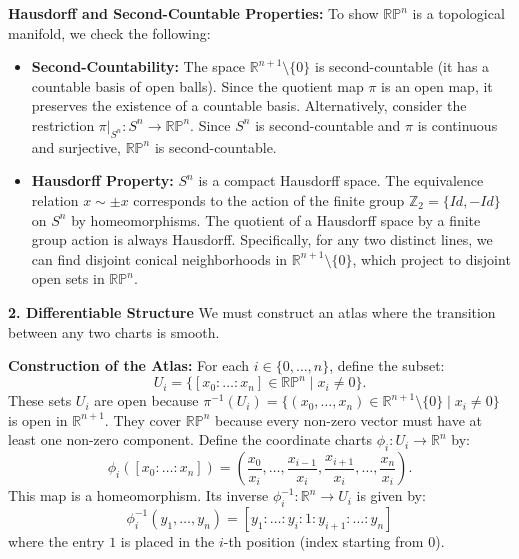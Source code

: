 \begin{solution}
\textbf{Hausdorff and Second-Countable Properties:}
To show $\mathbb{RP}^n$ is a topological manifold, we check the following:
\begin{itemize}
    \item \textbf{Second-Countability:} The space $\mathbb{R}^{n+1} \setminus \{0\}$ is second-countable (it has a countable basis of open balls). Since the quotient map $\pi$ is an open map, it preserves the existence of a countable basis. Alternatively, consider the restriction $\pi|_{S^n}: S^n \to \mathbb{RP}^n$. Since $S^n$ is second-countable and $\pi$ is continuous and surjective, $\mathbb{RP}^n$ is second-countable.
    \item \textbf{Hausdorff Property:} $S^n$ is a compact Hausdorff space. The equivalence relation $x \sim \pm x$ corresponds to the action of the finite group $\mathbb{Z}_2 = \{Id, -Id\}$ on $S^n$ by homeomorphisms. The quotient of a Hausdorff space by a finite group action is always Hausdorff. Specifically, for any two distinct lines, we can find disjoint conical neighborhoods in $\mathbb{R}^{n+1} \setminus \{0\}$, which project to disjoint open sets in $\mathbb{RP}^n$.
\end{itemize}

\textbf{2. Differentiable Structure}
We must construct an atlas where the transition between any two charts is smooth.

\textbf{Construction of the Atlas:}
For each $i \in \{0, \dots, n\}$, define the subset:
\[ U_i = \{ [x_0 : \dots : x_n] \in \mathbb{RP}^n \mid x_i \neq 0 \}. \]
These sets $U_i$ are open because $\pi^{-1}(U_i) = \{ (x_0, \dots, x_n) \in \mathbb{R}^{n+1} \setminus \{0\} \mid x_i \neq 0 \}$ is open in $\mathbb{R}^{n+1}$. They cover $\mathbb{RP}^n$ because every non-zero vector must have at least one non-zero component.
Define the coordinate charts $\phi_i: U_i \to \mathbb{R}^n$ by:
\[ \phi_i([x_0 : \dots : x_n]) = \left( \frac{x_0}{x_i}, \dots, \frac{x_{i-1}}{x_i}, \frac{x_{i+1}}{x_i}, \dots, \frac{x_n}{x_i} \right). \]
This map is a homeomorphism. Its inverse $\phi_i^{-1}: \mathbb{R}^n \to U_i$ is given by:
\[ \phi_i^{-1}(y_1, \dots, y_n) = [y_1 : \dots : y_i : 1 : y_{i+1} : \dots : y_n] \]
where the entry $1$ is placed in the $i$-th position (index starting from $0$).


\end{solution}
